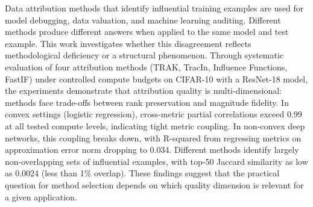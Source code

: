 
Data attribution methods that identify influential training examples are used for model debugging, data valuation, and machine learning auditing. Different methods produce different answers when applied to the same model and test example. This work investigates whether this disagreement reflects methodological deficiency or a structural phenomenon. Through systematic evaluation of four attribution methods (TRAK, TracIn, Influence Functions, FastIF) under controlled compute budgets on CIFAR-10 with a ResNet-18 model, the experiments demonstrate that attribution quality is multi-dimensional: methods face trade-offs between rank preservation and magnitude fidelity. In convex settings (logistic regression), cross-metric partial correlations exceed 0.99 at all tested compute levels, indicating tight metric coupling. In non-convex deep networks, this coupling breaks down, with R-squared from regressing metrics on approximation error norm dropping to 0.034. Different methods identify largely non-overlapping sets of influential examples, with top-50 Jaccard similarity as low as 0.0024 (less than 1\% overlap). These findings suggest that the practical question for method selection depends on which quality dimension is relevant for a given application.
